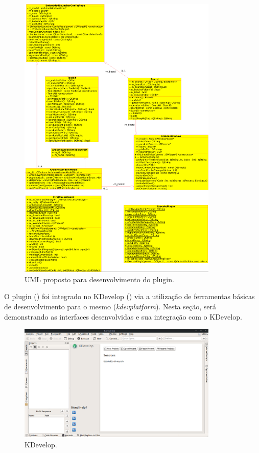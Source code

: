 \begin{figure}[!htb]
  \centering
  \caption[UML proposto]{UML proposto para desenvolvimento do plugin.}
  \label{fig:uml}
  \includegraphics[width=0.85\textwidth]{figuras/uml.png}
\end{figure}


O plugin () foi integrado no KDevelop () via a utilização de ferramentas básicas de desenvolvimento para o mesmo (\textit{kdevplatform}). Nesta seção, será demonstrando as interfaces desenvolvidas e sua integração com o KDevelop.

\begin{figure}[!htb]
  \centering
  \caption[KDevelop]{KDevelop.}
  \label{fig:kdevelop}
  \includegraphics[width=0.85\textwidth]{figuras/kdevelop.png}
\end{figure}

